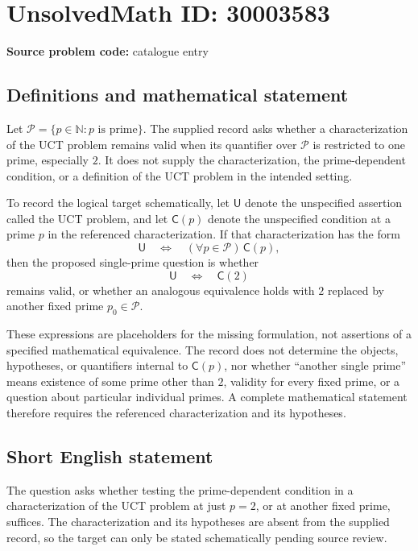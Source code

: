 \documentclass[11pt]{article}
\newcommand{\N}{\mathbb{N}}
\begin{document}
\section*{UnsolvedMath ID: 30003583}
\textbf{Source problem code:} catalogue entry
\subsection{Definitions and mathematical statement}
Let \(\mathcal P=\{p\in\N:p\text{ is prime}\}\). The supplied record asks whether a characterization of the UCT problem remains valid when its quantifier over \(\mathcal P\) is restricted to one prime, especially \(2\). It does not supply the characterization, the prime-dependent condition, or a definition of the UCT problem in the intended setting.

To record the logical target schematically, let \(\mathsf U\) denote the unspecified assertion called the UCT problem, and let \(\mathsf C(p)\) denote the unspecified condition at a prime \(p\) in the referenced characterization. If that characterization has the form
\[
\mathsf U\quad\Longleftrightarrow\quad (\forall p\in\mathcal P)\,\mathsf C(p),
\]
then the proposed single-prime question is whether
\[
\mathsf U\quad\Longleftrightarrow\quad\mathsf C(2)
\]
remains valid, or whether an analogous equivalence holds with \(2\) replaced by another fixed prime \(p_0\in\mathcal P\).

These expressions are placeholders for the missing formulation, not assertions of a specified mathematical equivalence. The record does not determine the objects, hypotheses, or quantifiers internal to \(\mathsf C(p)\), nor whether ``another single prime'' means existence of some prime other than \(2\), validity for every fixed prime, or a question about particular individual primes. A complete mathematical statement therefore requires the referenced characterization and its hypotheses.
\subsection{Short English statement}
The question asks whether testing the prime-dependent condition in a characterization of the UCT problem at just \(p=2\), or at another fixed prime, suffices. The characterization and its hypotheses are absent from the supplied record, so the target can only be stated schematically pending source review.
\end{document}
